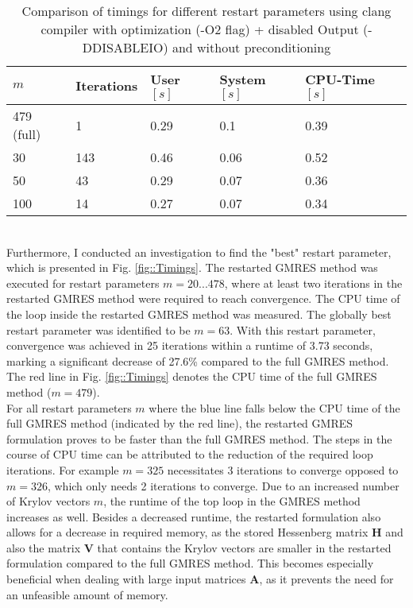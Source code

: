 \documentclass[11pt,a4paper]{article}
\newcommand{\refFig}[1]{Fig. \ref{#1}}
\begin{document}
%
\renewcommand{\arraystretch}{2}
\begin{table}[h!]
	\begin{center}
		\begin{tabular}{ p{2cm} p{2cm} p{1.5cm} p{1.8cm} p{2.5cm}}
			\hline
			\hline
			$m$ & Iterations & User $[s]$ & System $[s]$ & CPU-Time $[s]$ \\
			\hline
			\hline
			479 (full) & 1 & 0.29 & 0.1 & 0.39\\
			\hline
			\hline
			30 & 143 & 0.46 & 0.06 & 0.52\\
			\hline
			50 & 43 & 0.29 & 0.07 & 0.36\\
			\hline
			100 & 14 & 0.27 & 0.07 & 0.34\\
			\hline
			\hline
		\end{tabular}
		\caption{\label{tab:TimingsO2}  Comparison of timings for different restart parameters using clang compiler with optimization (-O2 flag) + disabled Output (-DDISABLEIO) and without preconditioning}
	\end{center}
\end{table}
\renewcommand{\arraystretch}{1}
%
\\
Furthermore, I conducted an investigation to find the "best" restart parameter, which is presented in \refFig{fig::Timings}. The restarted GMRES method was executed for restart parameters $m = 20...478$, where at least two iterations in the restarted GMRES method were required to reach convergence. The CPU time of the loop inside the restarted GMRES method was measured.
The globally best restart parameter was identified to be $m=63$. With this restart parameter, convergence was achieved in 25 iterations within a runtime of 3.73 seconds, marking a significant decrease of 27.6\% compared to the full GMRES method. The red line in \refFig{fig::Timings} denotes the CPU time of the full GMRES method ($m=479$).\\
%
For all restart parameters $m$ where the blue line falls below the CPU time of the full GMRES method (indicated by the red line), the restarted GMRES formulation proves to be faster than the full GMRES method. The steps in the course of CPU time can be attributed to the reduction of the required loop iterations. For example $m=325$ necessitates 3 iterations to converge opposed to $m=326$, which only needs 2 iterations to converge. Due to an increased number of Krylov vectors $m$, the runtime of the top loop in the GMRES method increases as well. Besides a decreased runtime, the restarted formulation also allows for a decrease in required memory, as the stored Hessenberg matrix $\mathbf{H}$ and also the matrix $\mathbf{V}$ that contains the Krylov vectors are smaller in the restarted formulation compared to the full GMRES method. This becomes especially beneficial when dealing with large input matrices $\mathbf{A}$, as it prevents the need for an unfeasible amount of memory.\\
\end{document}
